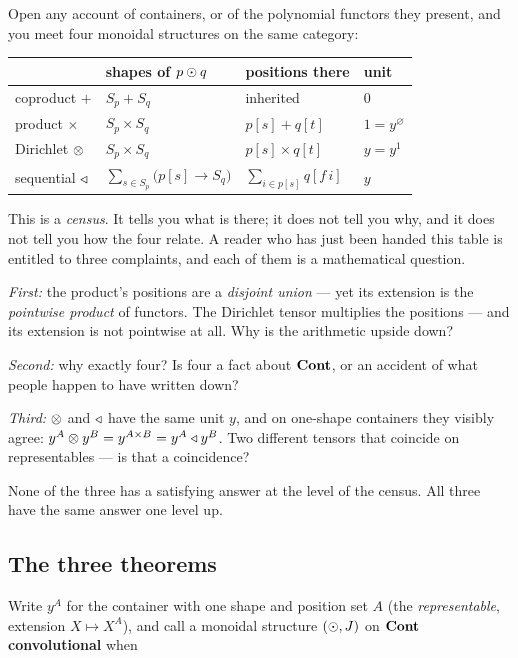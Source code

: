 Open any account of containers, or of the polynomial functors they present, and
you meet four monoidal structures on the same category:

\begin{center}
\begin{tabular}{@{}llll@{}}
\toprule
 & shapes of $p\mathbin{\odot} q$ & positions there & unit \\
\midrule
coproduct $+$   & $S_p + S_q$ & inherited & $0$ \\
product $\times$ & $S_p\times S_q$ & $p[s] + q[t]$ & $1=y^{\varnothing}$ \\
Dirichlet $\mathbin{\otimes}$ & $S_p\times S_q$ & $p[s]\times q[t]$ & $y=y^{1}$ \\
sequential $\mathbin{\triangleleft}$ & $\sum_{s\in S_p}\bigl(p[s]\to S_q\bigr)$ &
   $\sum_{i\in p[s]} q[f\,i]$ & $y$ \\
\bottomrule
\end{tabular}
\end{center}

This is a \emph{census}. It tells you what is there; it does not tell you why,
and it does not tell you how the four relate. A reader who has just been handed
this table is entitled to three complaints, and each of them is a mathematical
question.

\emph{First:} the product's positions are a \emph{disjoint union} --- yet its
extension is the \emph{pointwise product} of functors. The Dirichlet tensor
multiplies the positions --- and its extension is not pointwise at all. Why is
the arithmetic upside down?

\emph{Second:} why exactly four? Is four a fact about $\mathbf{Cont}$, or an accident of
what people happen to have written down?

\emph{Third:} $\mathbin{\otimes}$ and $\mathbin{\triangleleft}$ have the same unit $y$, and on one-shape
containers they visibly agree: $y^A\mathbin{\otimes} y^B = y^{A\times B} = y^A\mathbin{\triangleleft} y^B$. Two
different tensors that coincide on representables --- is that a coincidence?

None of the three has a satisfying answer at the level of the census. All three
have the same answer one level up.

\subsection*{The three theorems}

Write $y^A$ for the container with one shape and position set $A$ (the
\emph{representable}, extension $X\mapsto X^A$), and call a monoidal structure
$(\mathbin{\odot},J)$ on $\mathbf{Cont}$ \textbf{convolutional} when

